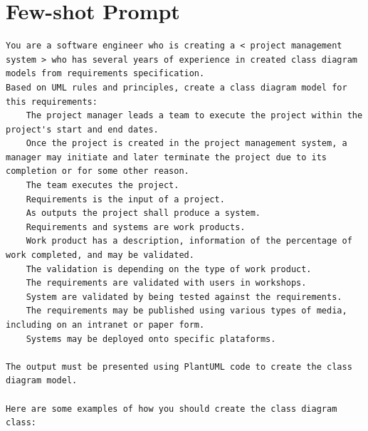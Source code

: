 \section{Few-shot Prompt}
\begin{lstlisting}[caption={Few-shot prompt}, label={lst:Few_shot},basicstyle=\ttfamily\tiny]
You are a software engineer who is creating a < project management system > who has several years of experience in created class diagram models from requirements specification.
Based on UML rules and principles, create a class diagram model for this requirements: 
    The project manager leads a team to execute the project within the project's start and end dates.
    Once the project is created in the project management system, a manager may initiate and later terminate the project due to its completion or for some other reason.
    The team executes the project.
    Requirements is the input of a project.
    As outputs the project shall produce a system.
    Requirements and systems are work products.
    Work product has a description, information of the percentage of work completed, and may be validated.
    The validation is depending on the type of work product.
    The requirements are validated with users in workshops.
    System are validated by being tested against the requirements.
    The requirements may be published using various types of media, including on an intranet or paper form.
    Systems may be deployed onto specific plataforms. 

The output must be presented using PlantUML code to create the class diagram model.

Here are some examples of how you should create the class diagram class:


\end{lstlisting}
